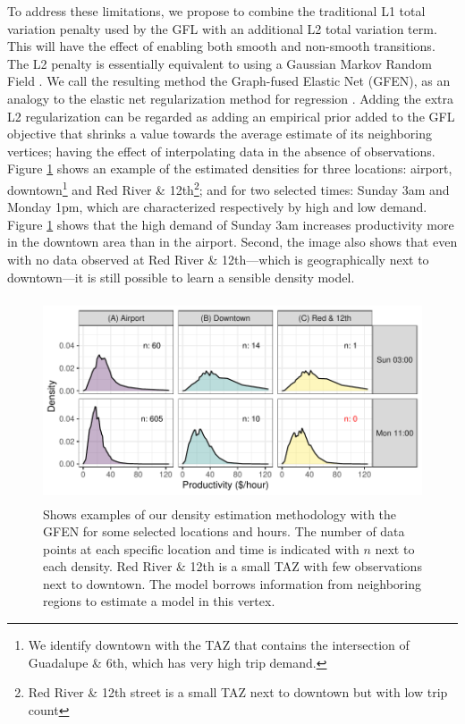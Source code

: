 \documentclass[a4paper, 11pt]{article}
\begin{document}
To address these limitations, we propose to combine the traditional L1 total variation penalty used by the GFL with an additional L2 total variation term. This will have the effect of enabling both smooth and non-smooth transitions. The L2 penalty is essentially equivalent to using a Gaussian Markov Random Field \citep{cressie-1993}. We call the resulting method the Graph-fused Elastic Net (GFEN), as an analogy to the elastic net regularization method for regression \citep{zou-2005}. Adding the extra L2 regularization can be regarded as adding an empirical prior added to the GFL objective that shrinks a value towards the average estimate of its neighboring vertices; having the effect of interpolating data in the absence of observations.  Figure \ref{fig:densities-sample} shows an example of the estimated densities for three locations: airport, downtown\footnote{We identify downtown with the TAZ that contains the intersection of Guadalupe \& 6th, which has very high trip demand.} and Red River \& 12th\footnote{Red River \& 12th street is a small TAZ next to downtown but with low trip count}; and for two selected times: Sunday 3am and Monday 1pm, which are characterized respectively by high and low demand. Figure \ref{fig:densities-sample} shows that the high demand of Sunday 3am increases productivity more in the downtown area than in the airport. Second, the image also shows that even with no data observed at Red River \& 12th---which is geographically next to downtown---it is still possible to learn a sensible density model.

\begin{figure}[tb]
    \centering
    \includegraphics[width=12cm, height=6cm]{img/densities_spacetime_sample.pdf}
    \caption{Shows examples of our density estimation methodology with the GFEN for some selected locations and hours. The number of data points at each specific location and time is indicated with $n$ next to each density. Red River \& 12th is a small TAZ with few observations next to downtown. The model borrows information from neighboring regions to estimate a model in this vertex.}
    \label{fig:densities-sample}
\end{figure}
\end{document}
